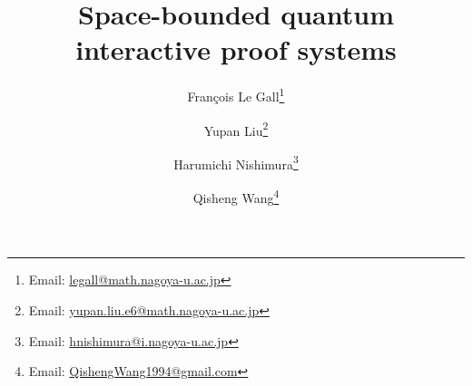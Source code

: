 \documentclass[11pt, a4paper]{article}
\numberwithin{equation}{section}
\numberwithin{figure}{section}
\begin{document}
\setlength{\abovedisplayskip}{6pt}
\setlength{\belowdisplayskip}{6pt}

\title{Space-bounded quantum interactive proof systems}

\author[1]{Fran\c{c}ois Le Gall\thanks{Email: \url{legall@math.nagoya-u.ac.jp}}}
\author[1]{Yupan Liu\thanks{Email: \url{yupan.liu.e6@math.nagoya-u.ac.jp}}}
\author[2]{Harumichi Nishimura\thanks{Email: \url{hnishimura@i.nagoya-u.ac.jp}}}
\author[3,1]{Qisheng Wang\thanks{Email: \url{QishengWang1994@gmail.com}}}


\date{}
\maketitle
{}
\thispagestyle{empty}
\end{document}
